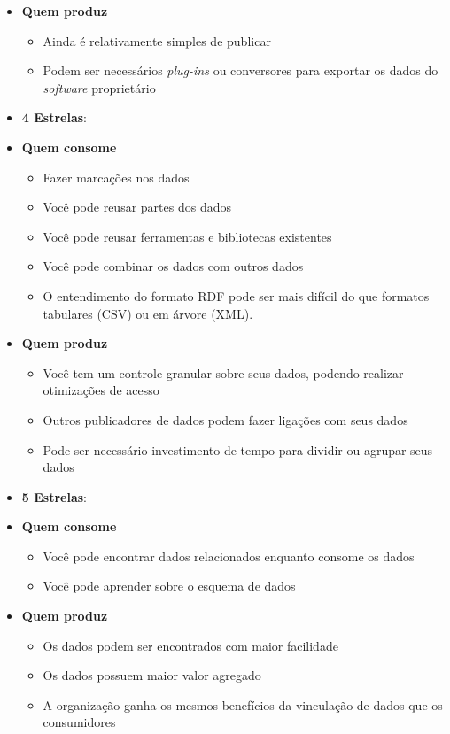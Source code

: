 \begin{itemize}
	\item[] \textbf{Quem produz}
		\begin{itemize}
			\itemsep0em
			\item Ainda é relativamente simples de publicar
			\item Podem ser necessários \emph{plug-ins} ou conversores para exportar os dados do \emph{software} proprietário
		\end{itemize}
\item \textbf{4 Estrelas}:
	\item[] \textbf{Quem consome}
		\begin{itemize}
			\itemsep0em
			\item Fazer marcações nos dados
			\item Você pode reusar partes dos dados
			\item Você pode reusar ferramentas e bibliotecas existentes
			\item Você pode combinar os dados com outros dados
			\item O entendimento do formato RDF pode ser mais difícil do que formatos tabulares (CSV) ou em árvore (XML).
			
		\end{itemize}
		
	\item[] \textbf{Quem produz}
		\begin{itemize}
			\itemsep0em
			\item Você tem um controle granular sobre seus dados, podendo realizar otimizações de acesso
			\item Outros publicadores de dados podem fazer ligações com seus dados
			\item Pode ser necessário investimento de tempo para dividir ou agrupar seus dados
			
		\end{itemize}
\item \textbf{5 Estrelas}:
	\item[] \textbf{Quem consome}
		\begin{itemize}
			\itemsep0em
			\item Você pode encontrar dados relacionados enquanto consome os dados
			\item Você pode aprender sobre o esquema de dados	
		\end{itemize}
		
	\item[] \textbf{Quem produz}
		\begin{itemize}
			\itemsep0em
			\item Os dados podem ser encontrados com maior facilidade
			\item Os dados possuem maior valor agregado
			\item A organização ganha os mesmos benefícios da vinculação de dados que os consumidores
		\end{itemize}
\end{itemize}

